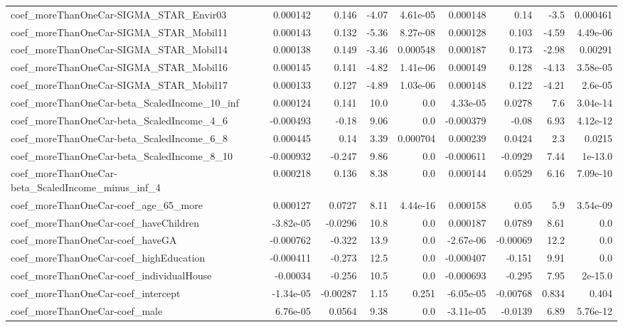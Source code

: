 \begin{tabular}{lrrrrrrrr}
coef_moreThanOneCar-SIGMA_STAR_Envir03 & 0.000142 & 0.146 & -4.07 & 4.61e-05 & 0.000148 & 0.14 & -3.5 & 0.000461 \\
coef_moreThanOneCar-SIGMA_STAR_Mobil11 & 0.000143 & 0.132 & -5.36 & 8.27e-08 & 0.000128 & 0.103 & -4.59 & 4.49e-06 \\
coef_moreThanOneCar-SIGMA_STAR_Mobil14 & 0.000138 & 0.149 & -3.46 & 0.000548 & 0.000187 & 0.173 & -2.98 & 0.00291 \\
coef_moreThanOneCar-SIGMA_STAR_Mobil16 & 0.000145 & 0.141 & -4.82 & 1.41e-06 & 0.000149 & 0.128 & -4.13 & 3.58e-05 \\
coef_moreThanOneCar-SIGMA_STAR_Mobil17 & 0.000133 & 0.127 & -4.89 & 1.03e-06 & 0.000148 & 0.122 & -4.21 & 2.6e-05 \\
coef_moreThanOneCar-beta_ScaledIncome_10_inf & 0.000124 & 0.141 & 10.0 & 0.0 & 4.33e-05 & 0.0278 & 7.6 & 3.04e-14 \\
coef_moreThanOneCar-beta_ScaledIncome_4_6 & -0.000493 & -0.18 & 9.06 & 0.0 & -0.000379 & -0.08 & 6.93 & 4.12e-12 \\
coef_moreThanOneCar-beta_ScaledIncome_6_8 & 0.000445 & 0.14 & 3.39 & 0.000704 & 0.000239 & 0.0424 & 2.3 & 0.0215 \\
coef_moreThanOneCar-beta_ScaledIncome_8_10 & -0.000932 & -0.247 & 9.86 & 0.0 & -0.000611 & -0.0929 & 7.44 & 1e-13.0 \\
coef_moreThanOneCar-beta_ScaledIncome_minus_inf_4 & 0.000218 & 0.136 & 8.38 & 0.0 & 0.000144 & 0.0529 & 6.16 & 7.09e-10 \\
coef_moreThanOneCar-coef_age_65_more & 0.000127 & 0.0727 & 8.11 & 4.44e-16 & 0.000158 & 0.05 & 5.9 & 3.54e-09 \\
coef_moreThanOneCar-coef_haveChildren & -3.82e-05 & -0.0296 & 10.8 & 0.0 & 0.000187 & 0.0789 & 8.61 & 0.0 \\
coef_moreThanOneCar-coef_haveGA & -0.000762 & -0.322 & 13.9 & 0.0 & -2.67e-06 & -0.00069 & 12.2 & 0.0 \\
coef_moreThanOneCar-coef_highEducation & -0.000411 & -0.273 & 12.5 & 0.0 & -0.000407 & -0.151 & 9.91 & 0.0 \\
coef_moreThanOneCar-coef_individualHouse & -0.00034 & -0.256 & 10.5 & 0.0 & -0.000693 & -0.295 & 7.95 & 2e-15.0 \\
coef_moreThanOneCar-coef_intercept & -1.34e-05 & -0.00287 & 1.15 & 0.251 & -6.05e-05 & -0.00768 & 0.834 & 0.404 \\
coef_moreThanOneCar-coef_male & 6.76e-05 & 0.0564 & 9.38 & 0.0 & -3.11e-05 & -0.0139 & 6.89 & 5.76e-12 \\

\end{tabular}
